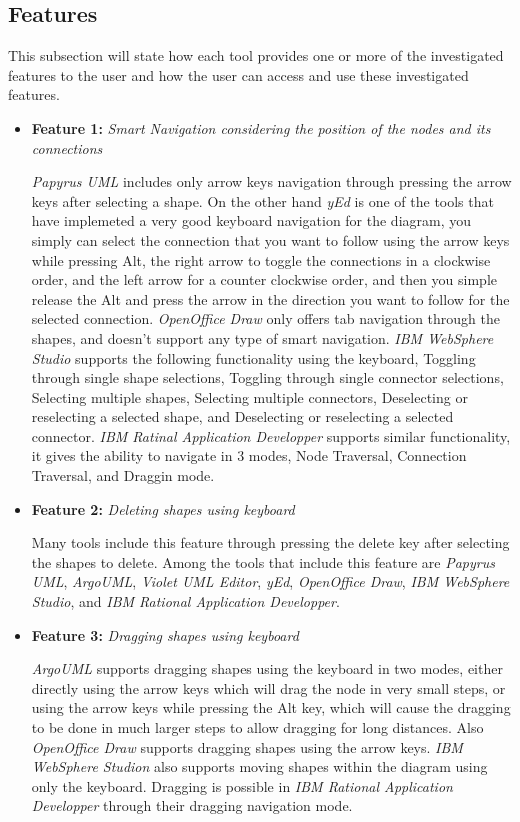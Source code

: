 \subsection{Features}
This subsection will state how each tool provides one or more of the investigated features to the user and how the user can access and use these investigated features.
\begin{itemize}
\item {\bf Feature 1:} {\em Smart Navigation considering the position of the nodes and its connections}
\par \noindent
{\em Papyrus UML} includes only arrow keys navigation through pressing the arrow keys after selecting a shape. On the other hand {\em yEd} is one of the tools that have implemeted a very good keyboard navigation for the diagram, you simply can select the connection that you want to follow using the arrow keys while pressing Alt, the right arrow to toggle the connections in a clockwise order, and the left arrow for a counter clockwise order, and then you simple release the Alt and press the arrow in the direction you want to follow for the selected connection. {\em OpenOffice Draw} only offers tab navigation through the shapes, and doesn't support any type of smart navigation. {\em IBM WebSphere Studio} supports the following functionality using the keyboard, Toggling through single shape selections, Toggling through single connector selections, Selecting multiple shapes, Selecting multiple connectors, Deselecting or reselecting a selected shape, and Deselecting or reselecting a selected connector. {\em IBM Ratinal Application Developper} supports similar functionality, it gives the ability to navigate in 3 modes, Node Traversal, Connection Traversal, and Draggin mode.


\item {\bf Feature 2:} {\em Deleting shapes using keyboard}
\par \noindent
Many tools include this feature through pressing the delete key after selecting the shapes to delete. Among the tools that include this feature are {\em Papyrus UML}, {\em ArgoUML}, {\em Violet UML Editor}, {\em yEd}, {\em OpenOffice Draw}, {\em IBM WebSphere Studio}, and {\em IBM Rational Application Developper}.

\item {\bf Feature 3:} {\em Dragging shapes using keyboard}
\par \noindent
{\em ArgoUML} supports dragging shapes using the keyboard in two modes, either directly using the arrow keys which will drag the node in very small steps, or using the arrow keys while pressing the Alt key, which will cause the dragging to be done in much larger steps to allow dragging for long distances. Also {\em OpenOffice Draw} supports dragging shapes using the arrow keys. {\em IBM WebSphere Studion} also supports moving shapes within the diagram using only the keyboard. Dragging is possible in {\em IBM Rational Application Developper} through their dragging navigation mode.


\end{itemize}
